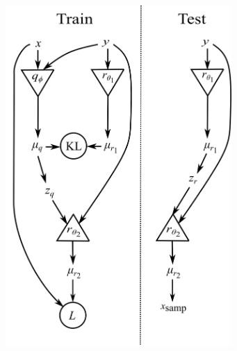 \documentclass[aps,superscriptaddress,twocolumn,nopreprintnumbers,floatfix,groupedaddress]{revtex4-1}
\newcommand{\figwidth}{8.6cm}
\begin{document}
%
%
%
%
\begin{figure}
	\centering
	\includegraphics[width=\figwidth]{figs/network_setup.png}
	\caption{}
	\label{fig:vit_flow}
\end{figure}
\end{document}
